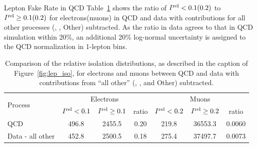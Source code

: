 \begin{section}{Lepton Fake Rate in QCD}
Table~\ref{tab:lep_iso} shows the ratio of $I^{\mathrm{rel}} < 0.1(0.2)$ to $I^{\mathrm{rel}} \geq 0.1(0.2)$ for electrons(muons) in QCD and data with contributions for all other processes (\ttbar, \Wjets, Other) subtracted.
As the ratio in data agrees to that in QCD simulation within 20\%, an additional 20\% log-normal uncertainty is assigned to the QCD normalization in 1-lepton bins.

\begin{table}[h]
\centering
\begin{tabular}{l | cc|c | cc|c }
\hline\hline
\multirow{2}{*}{Process}  &  \multicolumn{3}{c|}{Electrons}                                        &  \multicolumn{3}{c}{Muons}                                        \\
                          &  $I^{\mathrm{rel}} < 0.1$          &  $I^{\mathrm{rel}} \geq 0.1$  & ratio  &  $I^{\mathrm{rel}} < 0.2$      &  $I^{\mathrm{rel}} \geq 0.2$  &  ratio \\
\hline
QCD                       &  496.8                          &  2455.5                    &  0.20  &  219.8                      &  36553.3                   & 0.0060 \\
Data - all other          &  452.8                          &  2500.5                    &  0.18  &  275.4                      &  37497.7                   & 0.0073 \\
\hline\hline
\end{tabular}
\caption{Comparison of the relative isolation distributions, as described in the caption of Figure~\ref{fig:lep_iso}, for electrons and muons between QCD and data with contributions from ``all other'' (\ttbar, \Wjets, and Other) subtracted.}
\label{tab:lep_iso}
\end{table}

\end{section}

